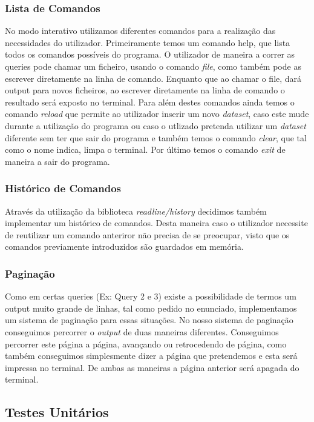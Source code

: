 \documentclass{article}
\begin{document}
        \subsubsection{Lista de Comandos}
            No modo interativo utilizamos diferentes comandos para a realização das necessidades do utilizador.
            Primeiramente temos um comando help, que lista todos os comandos possíveis do programa. O utilizador de maneira a correr as queries pode chamar um ficheiro, usando o comando \emph{file}, como também pode as escrever diretamente na linha de comando. Enquanto que ao chamar o file, dará output para novos ficheiros, ao escrever diretamente na linha de comando o resultado será exposto no terminal.
            Para além destes comandos ainda temos o comando \emph{reload} que permite ao utilizador inserir um novo \emph{dataset}, caso este mude durante a utilização do programa ou caso o utlizado pretenda utilizar um \emph{dataset} diferente sem ter que sair do programa e também temos o comando \emph{clear}, que tal como o nome indica, limpa o terminal. Por último temos o comando \emph{exit} de maneira a sair do programa.
        \subsubsection{Histórico de Comandos}
            Através da utilização da biblioteca \emph{readline/history} decidimos também implementar um histórico de comandos. Desta maneira caso o utilizador necessite de reutilizar um comando anteriror
            não precisa de se preocupar, visto que os comandos previamente introduzidos são guardados em memória.
        \subsubsection{Paginação}
            Como em certas queries (Ex: Query 2 e 3) existe a possibilidade de termos um output muito grande de linhas, tal como pedido no enunciado, implementamos um sistema de paginação para essas situações.
            No nosso sistema de paginação conseguimos percorrer o \emph{output} de duas maneiras diferentes. Conseguimos percorrer este página a página, avançando ou retrocedendo de página, como também conseguimos simplesmente dizer a página que pretendemos e esta será impressa no terminal. De ambas as maneiras a página anterior será apagada do terminal.
    \subsection{Testes Unitários}
\end{document}
